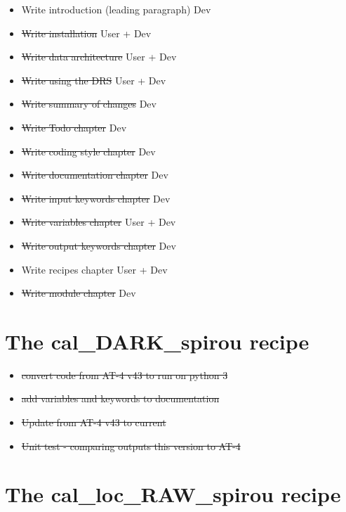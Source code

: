 \begin{itemize}
	\item Write introduction (leading paragraph) \dotfill Dev
	\item \sout{Write installation} \dotfill User + Dev
	\item \sout{Write data architecture} \dotfill User + Dev
	\item \sout{Write using the DRS} \dotfill User + Dev
	\item \sout{Write summary of changes} \dotfill Dev
	\item \sout{Write Todo chapter} \dotfill Dev
	\item \sout{Write coding style chapter} \dotfill Dev
	\item \sout{Write documentation chapter} \dotfill Dev
	\item \sout{Write input keywords chapter} \dotfill Dev
	\item \sout{Write variables chapter} \dotfill User + Dev
	\item \sout{Write output keywords chapter} \dotfill Dev
	\item Write recipes chapter \dotfill User + Dev
	\item \sout{Write module chapter} \dotfill Dev
\end{itemize}


\section{The cal\_DARK\_spirou recipe}
\label{ch:todo:cal_DARK_spirou}

\begin{itemize}
	\item \sout{convert code from AT-4 v43 to run on python 3}
	\item \sout{add variables and keywords to documentation}
	\item \sout{Update from AT-4 v43 to current}
	\item \sout{Unit test - comparing outputs this version to AT-4}
\end{itemize}

\section{The cal\_loc\_RAW\_spirou recipe}
\label{ch:todo:cal_loc_RAW_spirou}

